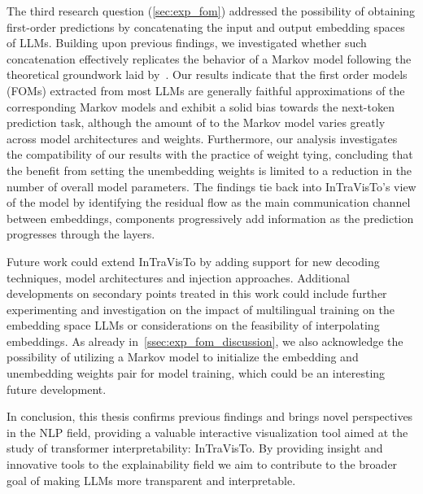 The third research question (\cref{sec:exp_fom}) addressed the possibility of obtaining first-order predictions by concatenating the input and output embedding spaces of LLMs.
Building upon previous findings, we investigated whether such concatenation effectively replicates the behavior of a Markov model following the theoretical groundwork laid by~\citet{elhage2021}.
Our results indicate that the first order models (FOMs) extracted from most LLMs are generally faithful approximations of the corresponding Markov models and exhibit a solid bias towards the next-token prediction task, although the amount of  to the Markov model varies greatly across model architectures and weights.
Furthermore, our analysis investigates the compatibility of our results with the practice of weight tying, concluding that the benefit from setting the unembedding weights  is limited to a reduction in the number of overall model parameters.
The  findings tie back into InTraVisTo's view of the model by identifying the residual flow as the main communication channel between embeddings,  components progressively add information as the prediction progresses through the layers.

Future work could extend InTraVisTo by adding support for new decoding techniques, model architectures and injection approaches.
Additional developments on  secondary points treated in this work could include further experimenting and investigation on the impact of multilingual training on the embedding space LLMs or  considerations on the feasibility of interpolating embeddings.
As already  in~\cref{ssec:exp_fom_discussion}, we also acknowledge the possibility of utilizing a Markov model to initialize the embedding and unembedding weights pair for model training, which could be an interesting future development.

In conclusion, this thesis confirms previous findings and brings novel perspectives in the NLP field, providing a valuable interactive visualization tool aimed at  the study of transformer interpretability: InTraVisTo.
By providing insight and innovative tools to the explainability field we aim to contribute to the broader goal of making LLMs more transparent and interpretable.
